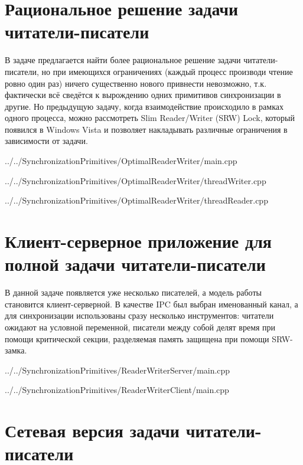 \documentclass[a4paper, 12pt]{article}		%
\begin{document}
\section{Рациональное решение задачи читатели-писатели}

В задаче предлагается найти более рациональное решение задачи читатели-писатели, но при имеющихся ограничениях (каждый процесс производи чтение ровно один раз) ничего существенно нового привнести невозможно, т.к. фактически всё сведётся к вырождению одних примитивов синхронизации в другие. Но предыдущую задачу, когда взаимодействие происходило в рамках одного процесса, можно рассмотреть Slim Reader/Writer (SRW) Lock, который появился в Windows Vista и позволяет накладывать различные ограничения в зависимости от задачи.


{../../SynchronizationPrimitives/OptimalReaderWriter/main.cpp}


{../../SynchronizationPrimitives/OptimalReaderWriter/threadWriter.cpp}



{../../SynchronizationPrimitives/OptimalReaderWriter/threadReader.cpp}


\newpage
\section{Клиент-серверное приложение для полной задачи читатели-писатели}

В данной задаче появляется уже несколько писателей, а модель работы становится клиент-серверной. В качестве IPC был выбран именованный канал, а для синхронизации использованы сразу несколько инструментов: читатели ожидают на условной переменной, писатели между собой делят время при помощи критической секции, разделяемая память защищена при помощи SRW-замка.


{../../SynchronizationPrimitives/ReaderWriterServer/main.cpp}



{../../SynchronizationPrimitives/ReaderWriterClient/main.cpp}


\newpage
\section{Сетевая версия задачи читатели-писатели}
\end{document}

